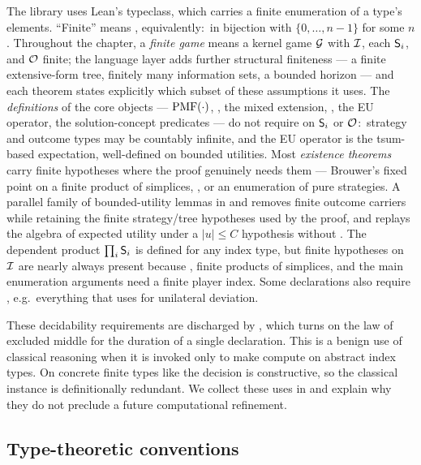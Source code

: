 The library uses Lean's  typeclass, which carries a
finite enumeration of a type's elements.  ``Finite'' means
, equivalently:\ in bijection with $\{0, \dots, n-1\}$
for some $n$.  Throughout the chapter, a \emph{finite game} means a
kernel game $\mathcal{G}$ with $\mathcal{I}$, each $\mathsf{S}_i$, and $\mathcal{O}$
finite; the language layer adds further structural finiteness — a
finite extensive-form tree, finitely many information sets, a
bounded horizon — and each theorem states explicitly which subset
of these assumptions it uses.  The \emph{definitions} of the core objects —
$\mathrm{PMF}(\cdot)$, , the mixed extension, ,
the EU operator, the solution-concept predicates — do not
require  on $\mathsf{S}_i$ or $\mathcal{O}$:\ strategy and
outcome types may be countably infinite, and the EU operator is
the tsum-based expectation, well-defined on bounded utilities.
Most \emph{existence theorems} carry finite hypotheses where the
proof genuinely needs them — Brouwer's fixed point on a finite
product of simplices, , or an enumeration of
pure strategies.  A parallel family of bounded-utility
 lemmas in  and
 removes finite outcome carriers while
retaining the finite strategy/tree hypotheses used by the proof, and
replays the algebra of expected utility under a $|u| \le C$ hypothesis
without .  The dependent product
$\prod_i \mathsf{S}_i$ is defined for any index type, but finite
hypotheses on $\mathcal{I}$ are nearly always present because
, finite products of simplices, and the main enumeration
arguments need a finite player index.  Some declarations also require
, e.g.\ everything that uses
 for unilateral deviation.

These decidability requirements are discharged by
, which turns on the law of excluded middle for
the duration of a single declaration.  This is a benign use of
classical reasoning when it is invoked only to make
 compute on abstract index types.  On concrete
finite types like  the decision is constructive, so the
classical instance is definitionally redundant.  We collect these uses in
 and explain why they do
not preclude a future computational refinement.

\subsection{Type-theoretic conventions}
\label{sec:prelim:type-theory}

